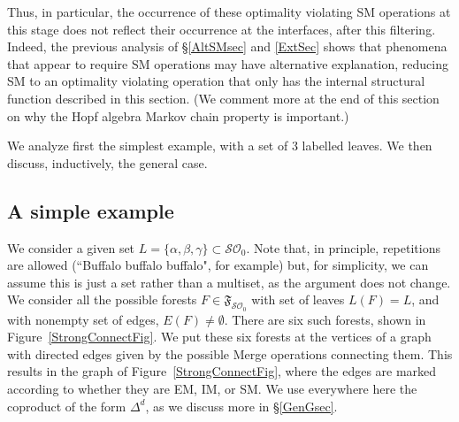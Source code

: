 \documentclass[12pt]{amsart}
\numberwithin{equation}{section}
\def\cO{{\mathcal O}}
\def\cS{{\mathcal S}}
\def\fF{{\mathfrak F}}
\begin{document}
\smallskip

Thus, in particular, the occurrence of these optimality violating SM operations at this
stage does not reflect their occurrence at the interfaces, after this filtering. Indeed,
the previous analysis of \S \ref{AltSMsec} and \ref{ExtSec} shows that phenomena
that appear to require SM operations may have alternative explanation, reducing
SM to an optimality violating operation that only has the internal structural function
described in this section. (We comment more at the end of this section on why
the Hopf algebra Markov chain property is important.) 

\smallskip

We analyze first the simplest example, with a set of $3$ labelled leaves.
We then discuss, inductively, the general case.


\subsection{A simple example}\label{ExGsec}

We consider a given set $L=\{ \alpha, \beta, \gamma \}\subset \cS\cO_0$. Note that,
in principle, repetitions are allowed (``Buffalo buffalo buffalo", for example) but, for
simplicity, we can assume this is just a set rather than a multiset, as the argument
does not change. We consider all the possible forests $F\in \fF_{\cS\cO_0}$ with
set of leaves $L(F)=L$, and with nonempty set of edges, $E(F)\neq \emptyset$.
There are six such forests, shown in Figure~\ref{StrongConnectFig}. We put
these six forests at the vertices of a graph with directed edges given by the
possible Merge operations connecting them. This results in the graph of 
Figure~\ref{StrongConnectFig}, where the edges are marked according to
whether they are EM, IM, or SM. We use everywhere here the coproduct of
the form $\Delta^d$, as we discuss more in \S \ref{GenGsec}. 

\smallskip
\end{document}
